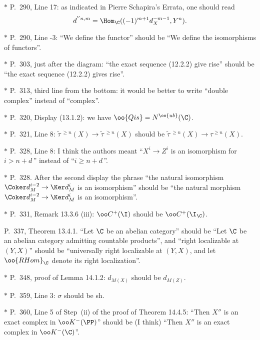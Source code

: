 \documentclass[12pt]{article}
\theoremstyle{remark}
\theoremstyle{definition}
\begin{document}
\begin{s}
\nn$*$ P.~290, Line 17: as indicated in Pierre Schapira's Errata, one should read 
$$
d^{''n,m}=\Hom_\C((-1)^{m+1}d_X^{-m-1},Y^n).
$$
\end{s}

\nn$*$ P.~290, Line -3: ``We define the functor'' should be ``We define the isomorphisms of functors''.

\nn$*$ P.~303, just after the diagram: ``the exact sequence (12.2.2) give rise'' should be ``the exact sequence (12.2.2) gives rise''.

\nn$*$ P.~313, third line from the bottom: it would be better to write ``double complex'' instead of ``complex''.

\nn$*$ P.~320, Display (13.1.2): we have $\oo{Qis}=N^{\oo{ub}}(\C)$.

\nn$*$ P.~321, Line 8: $\widetilde\tau\,{}^{\ge n}(X)\to\widetilde\tau\,{}^{\ge n}(X)$ should be $\widetilde\tau\,{}^{\ge n}(X)\to\tau^{\ge n}(X)$.

\nn$*$ P.~328, Line 8: I think the authors meant ``$X^i\to Z^i$ is an isomorphism for $i>n+d\,$'' instead of ``$i\ge n+d\,$''.

\nn$*$ P.~328. After the second display the phrase ``the natural isomorphism $\Coker d_M^{i-2}\to\Ker d_M^i$ is an isomorphism'' should be ``the natural morphism $\Coker d_M^{i-2}\to\Ker d_M^i$ is an isomorphism''.

\nn$*$ P.~331, Remark 13.3.6 (iii): $\oo C^+(\I)$ should be $\oo C^+(\I_\C)$.

\begin{s}
P.~337, Theorem 13.4.1. ``Let $\C$ be an abelian category'' should be ``Let $\C$ be an abelian category admitting countable products'', and ``right localizable at $(Y,X)$'' should be ``universally right localizable at $(Y,X)$, and let $\oo{RHom}_\C$ denote its right localization''.
\end{s}

\nn$*$ P.~348, proof of Lemma 14.1.2: $d_{M(X)}$ should be $d_{M(Z)}$.

\nn$*$ P.~359, Line 3: $\sigma$ should be sh.


\nn$*$ P.~360, Line 5 of Step~(ii) of the proof of Theorem 14.4.5: ``Then $X''$ is an exact complex in $\oo K^-(\PP)$'' should be (I think) ``Then $X''$ is an exact complex in $\oo K^-(\C)$''.
\end{document}
